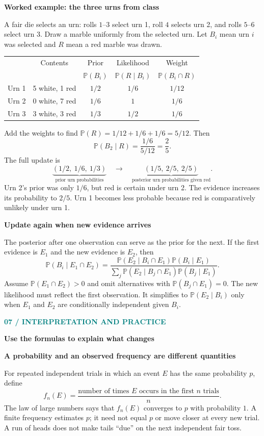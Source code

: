 \documentclass[11pt,letterpaper]{article}
\newcommand{\Pp}{\mathbb{P}}
\newcommand{\sectionpage}[2]{\textcolor{teal}{\small\textbf{#1}}\par{\LARGE\bfseries\color{ink}#2}\par\medskip}
\newcommand{\minihead}[1]{\par\smallskip\textbf{\color{ink}#1}\par}
\begin{document}
\minihead{Worked example: the three urns from class}
A fair die selects an urn: rolls $1$--$3$ select urn 1, roll $4$ selects urn 2, and rolls $5$--$6$ select urn 3. Draw a marble uniformly from the selected urn. Let $B_i$ mean urn $i$ was selected and $R$ mean a red marble was drawn.
\begin{center}
\renewcommand{\arraystretch}{1.3}
\begin{tabular}{@{}lcccc@{}}\toprule
& Contents & Prior & Likelihood & Weight\\
& & $\Pp(B_i)$ & $\Pp(R\mid B_i)$ & $\Pp(B_i\cap R)$\\\midrule
Urn 1 & 5 white, 1 red & $1/2$ & $1/6$ & $1/12$\\
Urn 2 & 0 white, 7 red & $1/6$ & $1$ & $1/6$\\
Urn 3 & 3 white, 3 red & $1/3$ & $1/2$ & $1/6$\\\bottomrule
\end{tabular}
\end{center}
Add the weights to find $\Pp(R)=1/12+1/6+1/6=5/12$. Then
\[
\Pp(B_2\mid R)=\frac{1/6}{5/12}=\frac25.
\]
The full update is
\[
\underbrace{(1/2,\ 1/6,\ 1/3)}_{\text{prior urn probabilities}}
\quad\longrightarrow\quad
\underbrace{(1/5,\ 2/5,\ 2/5)}_{\text{posterior urn probabilities given red}}.
\]
Urn 2's prior was only $1/6$, but red is certain under urn 2. The evidence increases its probability to $2/5$. Urn 1 becomes less probable because red is comparatively unlikely under urn 1.

\minihead{Update again when new evidence arrives}
The posterior after one observation can serve as the prior for the next. If the first evidence is $E_1$ and the new evidence is $E_2$, then
\[
\Pp(B_i\mid E_1\cap E_2)=
\frac{\Pp(E_2\mid B_i\cap E_1)\Pp(B_i\mid E_1)}
{\sum_j\Pp(E_2\mid B_j\cap E_1)\Pp(B_j\mid E_1)}.
\]
Assume $\Pp(E_1\cap E_2)>0$ and omit alternatives with $\Pp(B_j\cap E_1)=0$. The new likelihood must reflect the first observation. It simplifies to $\Pp(E_2\mid B_i)$ only when $E_1$ and $E_2$ are conditionally independent given $B_i$.

\newpage
\sectionpage{07 / INTERPRETATION AND PRACTICE}{Use the formulas to explain what changes}
\minihead{A probability and an observed frequency are different quantities}
For repeated independent trials in which an event $E$ has the same probability $p$, define
\[
f_n(E)=\frac{\text{number of times }E\text{ occurs in the first }n\text{ trials}}{n}.
\]
The law of large numbers says that $f_n(E)$ converges to $p$ with probability $1$. A finite frequency estimates $p$; it need not equal $p$ or move closer at every new trial. A run of heads does not make tails ``due'' on the next independent fair toss.
\end{document}
